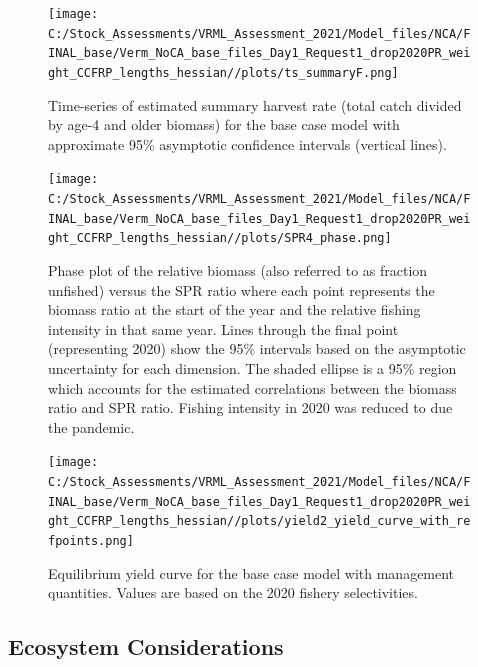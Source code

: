 \documentclass[11pt,
  english,
]{article}
\begin{document}
\begin{figure}
\centering
\texttt{[image: C:/Stock\_Assessments/VRML\_Assessment\_2021/Model\_files/NCA/FINAL\_base/Verm\_NoCA\_base\_files\_Day1\_Request1\_drop2020PR\_weight\_CCFRP\_lengths\_hessian//plots/ts\_summaryF.png]}
\caption{Time-series of estimated summary harvest rate (total catch divided by age-4 and older biomass) for the base case model with approximate 95\% asymptotic confidence intervals (vertical lines).\label{fig:FmortalityES}}
\end{figure}

\begin{figure}
\centering
\texttt{[image: C:/Stock\_Assessments/VRML\_Assessment\_2021/Model\_files/NCA/FINAL\_base/Verm\_NoCA\_base\_files\_Day1\_Request1\_drop2020PR\_weight\_CCFRP\_lengths\_hessian//plots/SPR4\_phase.png]}
\caption{Phase plot of the relative biomass (also referred to as fraction unfished) versus the SPR ratio where each point represents the biomass ratio at the start of the year and the relative fishing intensity in that same year. Lines through the final point (representing 2020) show the 95\% intervals based on the asymptotic uncertainty for each dimension. The shaded ellipse is a 95\% region which accounts for the estimated correlations between the biomass ratio and SPR ratio. Fishing intensity in 2020 was reduced to due the pandemic.\label{fig:phaseES}}
\end{figure}

\begin{figure}
\centering
\texttt{[image: C:/Stock\_Assessments/VRML\_Assessment\_2021/Model\_files/NCA/FINAL\_base/Verm\_NoCA\_base\_files\_Day1\_Request1\_drop2020PR\_weight\_CCFRP\_lengths\_hessian//plots/yield2\_yield\_curve\_with\_refpoints.png]}
\caption{Equilibrium yield curve for the base case model with management quantities. Values are based on the 2020 fishery selectivities.\label{fig:yield2ES}}
\end{figure}

\FloatBarrier


\hypertarget{ecosystem-considerations}{%
\subsection*{Ecosystem Considerations}\label{ecosystem-considerations}}

\leavevmode\tagmcend\tagstructend
\end{document}
